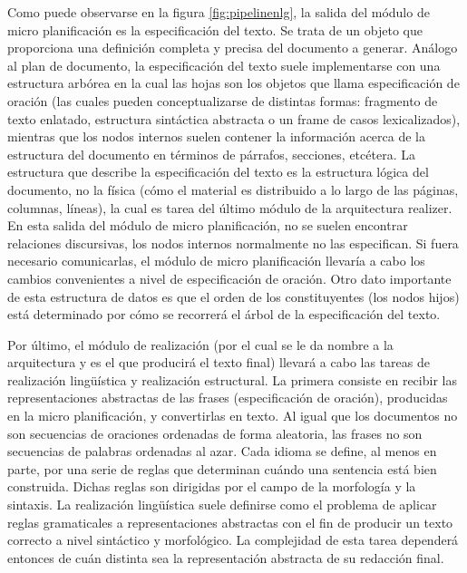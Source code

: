 Como puede observarse en la figura \ref{fig:pipelinenlg}, la salida del módulo de micro planificación es la especificación del texto. Se trata de un objeto que proporciona una definición completa y precisa del documento a generar. Análogo al plan de documento, la especificación del texto suele implementarse con una estructura arbórea en la cual las hojas son los objetos que \cite{biblia} llama especificación de oración (las cuales pueden conceptualizarse de distintas formas: fragmento de texto enlatado, estructura sintáctica abstracta o un frame de casos lexicalizados), mientras que los nodos internos suelen contener la información acerca de la estructura del documento en términos de párrafos, secciones, etcétera. La estructura que describe la especificación del texto es la estructura lógica del documento, no la física (cómo el material es distribuido a lo largo de las páginas, columnas, líneas), la cual es tarea del último módulo de la arquitectura realizer. En esta salida del módulo de micro planificación, no se suelen encontrar relaciones discursivas, los nodos internos normalmente no las especifican. Si fuera necesario comunicarlas, el módulo de micro planificación llevaría a cabo los cambios convenientes a nivel de especificación de oración. Otro dato importante de esta estructura de datos es que el orden de los constituyentes (los nodos hijos) está determinado por cómo se recorrerá el árbol de la especificación del texto.

Por último, el módulo de realización (por el cual se le da nombre a la arquitectura y es el que producirá el texto final) llevará a cabo las tareas de realización lingüística y realización estructural. La primera consiste en recibir las representaciones abstractas de las frases (especificación de oración), producidas en la micro planificación, y convertirlas en texto. Al igual que los documentos no son secuencias de oraciones ordenadas de forma aleatoria, las frases no son secuencias de palabras ordenadas al azar. Cada idioma se define, al menos en parte, por una serie de reglas que determinan cuándo una sentencia está bien construida. Dichas reglas son dirigidas por el campo de la morfología y la sintaxis. La realización lingüística suele definirse como el problema de aplicar reglas gramaticales a representaciones abstractas con el fin de producir un texto correcto a nivel sintáctico y morfológico. La complejidad de esta tarea dependerá entonces de cuán distinta sea la representación abstracta de su redacción final.

